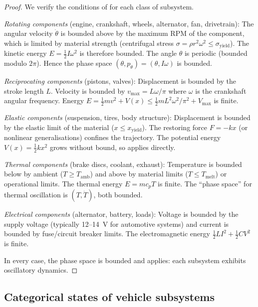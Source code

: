 \documentclass[twocolumn,10pt,a4paper]{article}
\theoremstyle{definition}
\theoremstyle{remark}
\begin{document}
\begin{proof}
We verify the conditions of  for each class of subsystem.

\emph{Rotating components} (engine, crankshaft, wheels, alternator, fan, drivetrain): The angular velocity $\dot{\theta}$ is bounded above by the maximum RPM of the component, which is limited by material strength (centrifugal stress $\sigma = \rho r^2 \omega^2 \leq \sigma_{\mathrm{yield}}$). The kinetic energy $E = \frac{1}{2}I\omega^2$ is therefore bounded. The angle $\theta$ is periodic (bounded modulo $2\pi$). Hence the phase space $(\theta, p_\theta) = (\theta, I\omega)$ is bounded.

\emph{Reciprocating components} (pistons, valves): Displacement is bounded by the stroke length $L$. Velocity is bounded by $v_{\max} = L \omega / \pi$ where $\omega$ is the crankshaft angular frequency. Energy $E = \frac{1}{2}mv^2 + V(x) \leq \frac{1}{2}mL^2\omega^2/\pi^2 + V_{\max}$ is finite.

\emph{Elastic components} (suspension, tires, body structure): Displacement is bounded by the elastic limit of the material ($x \leq x_{\mathrm{yield}}$). The restoring force $F = -kx$ (or nonlinear generalisations) confines the trajectory. The potential energy $V(x) = \frac{1}{2}kx^2$ grows without bound, so  applies directly.

\emph{Thermal components} (brake discs, coolant, exhaust): Temperature is bounded below by ambient ($T \geq T_{\mathrm{amb}}$) and above by material limits ($T \leq T_{\mathrm{melt}}$) or operational limits. The thermal energy $E = mc_p T$ is finite. The ``phase space'' for thermal oscillation is $(T, \dot{T})$, both bounded.

\emph{Electrical components} (alternator, battery, loads): Voltage is bounded by the supply voltage (typically 12--14~V for automotive systems) and current is bounded by fuse/circuit breaker limits. The electromagnetic energy $\frac{1}{2}LI^2 + \frac{1}{2}CV^2$ is finite.

In every case, the phase space is bounded and  applies: each subsystem exhibits oscillatory dynamics.
\end{proof}

\subsection{Categorical states of vehicle subsystems}
\end{document}
